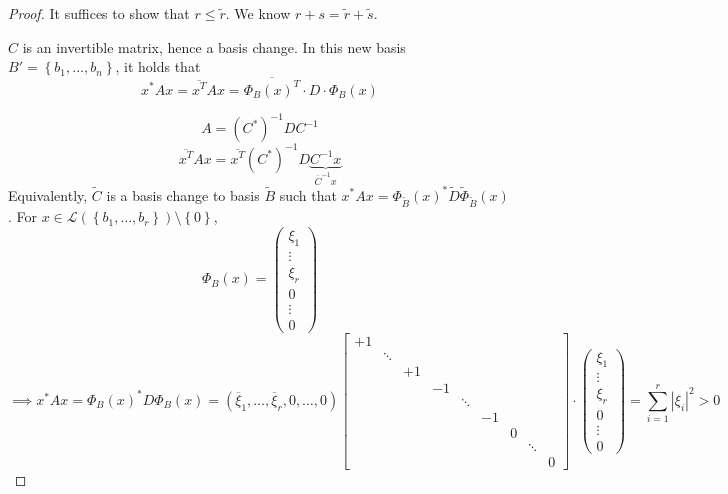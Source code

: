 \documentclass{article}
\newcommand{\set}[1]{\left\{#1\right\}}
\newcommand{\card}[1]{\left|#1\right|}
\begin{document}
\begin{proof}
  It suffices to show that $r \leq \tilde r$.
  We know $r+s = \tilde r + \tilde s$.

  $C$ is an invertible matrix, hence a basis change.
  In this new basis $B' = \set{b_1, \dots, b_n}$, it holds that
  \[ x^* A x = \overline{x^T} A x = \overline{\Phi_B(x)^T} \cdot D \cdot \Phi_B(x) \]

  \[ A = (C^*)^{-1} D C^{-1} \]
  \[ \overline{x^T} A x = \overline{x^T} (C^*)^{-1} D \underbrace{C^{-1} x}_{\overline{C}^{-1} x} \]
  Equivalently, $\tilde C$ is a basis change to basis $\tilde B$
  such that $x^* Ax = \Phi_{\tilde B}(x)^* \tilde D \tilde\Phi_{\tilde B}(x)$.
  For $x \in \mathcal L(\set{b_1, \dots, b_r}) \setminus \set{0}$,
  \[ \Phi_B(x) = \begin{pmatrix} \xi_1 \\ \vdots \\ \xi_r \\ 0 \\ \vdots \\ 0 \end{pmatrix} \]
  \[ \implies x^* A x = \Phi_B(x)^* D \Phi_B(x)
    = (\overline{\xi}_1, \dots, \overline{\xi}_r, 0, \dots, 0)
    \begin{bmatrix}
       +1 &        &       &    &        &    &   &        & \\
          & \ddots &       &    &        &    &   &        & \\
          &        &    +1 &    &        &    &   &        & \\
          &        &       & -1 &        &    &   &        & \\
          &        &       &    & \ddots &    &   &        & \\
          &        &       &    &        & -1 &   &        & \\
          &        &       &    &        &    & 0 &        & \\
          &        &       &    &        &    &   & \ddots & \\
          &        &       &    &        &    &   &        & 0
    \end{bmatrix} \cdot
    \begin{pmatrix}
      \xi_1 \\ \vdots \\ \xi_r \\ 0 \\ \vdots \\ 0
    \end{pmatrix}
    = \sum_{i=1}^r \card{\xi_i}^2 > 0
\]
\end{proof}
\end{document}
